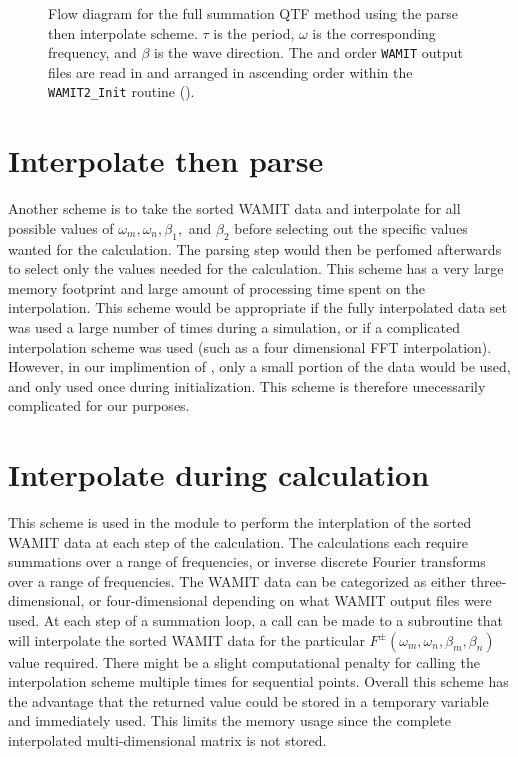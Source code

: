 \begin{figure}[ht]
   \begin{center}
         
      \endpgfgraphicnamed
   \end{center}
\caption{Flow diagram for the full summation QTF method using the parse then interpolate scheme.  $\tau$ is the period, $\omega$ is the corresponding frequency, and $\beta$ is the wave direction.  The  and  order {\tt WAMIT} output files are read in and arranged in ascending order within the {\tt WAMIT2\_Init} routine ().
   \label{fig:SumQTF:Flowchart:ParseInterp}
}
\end{figure}

\clearpage

\section{Interpolate then parse}
Another scheme is to take the sorted WAMIT data and interpolate for all possible values of $\omega_m, \omega_n, \beta_1,$ and $\beta_2$ before selecting out the specific values wanted for the calculation.  The parsing step would then be perfomed afterwards to select only the values needed for the calculation.  This scheme has a very large memory footprint and large amount of processing time spent on the interpolation.  This scheme would be appropriate if the fully interpolated data set was used a large number of times during a \HD simulation, or if a complicated interpolation scheme was used (such as a four dimensional FFT interpolation).  However, in our implimention of \HD, only a small portion of the data would be used, and only used once during initialization.  This scheme is therefore unecessarily complicated for our purposes.

\section{Interpolate during calculation}
This scheme is used in the  module to perform the interplation of the sorted WAMIT data at each step of the calculation.  The calculations each require summations over a range of frequencies, or inverse discrete Fourier transforms over a range of frequencies.  The WAMIT data can be categorized as either three-dimensional, or four-dimensional depending on what WAMIT output files were used.  At each step of a summation loop, a call can be made to a subroutine that will interpolate the sorted WAMIT data for the particular $F^\pm(\omega_m,\omega_n,\beta_m,\beta_n)$ value required.  There might be a slight computational penalty for calling the interpolation scheme multiple times for sequential points.  Overall this scheme has the advantage that the returned value could be stored in a temporary variable and immediately used.  This limits the memory usage since the complete interpolated multi-dimensional matrix is not stored.

